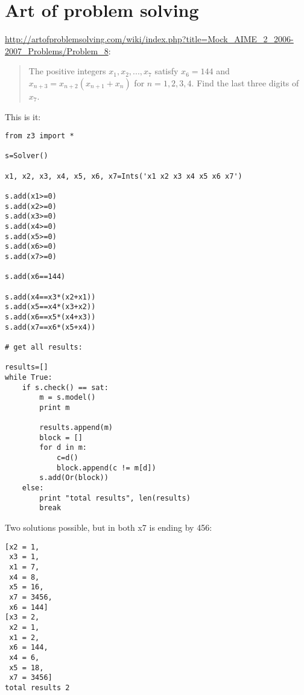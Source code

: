 \section{Art of problem solving}

\url{http://artofproblemsolving.com/wiki/index.php?title=Mock_AIME_2_2006-2007_Problems/Problem_8}:

\begin{framed}
\begin{quotation}
The positive integers $x_1, x_2, ... , x_7$ satisfy $x_6 = 144$ and $x_{n+3} = x_{n+2}(x_{n+1}+x_n)$ for $n = 1, 2, 3, 4$. Find the last three digits of $x_7$.
\end{quotation}
\end{framed}

This is it:

\begin{lstlisting}[style=custompy]
from z3 import *

s=Solver()

x1, x2, x3, x4, x5, x6, x7=Ints('x1 x2 x3 x4 x5 x6 x7')

s.add(x1>=0)
s.add(x2>=0)
s.add(x3>=0)
s.add(x4>=0)
s.add(x5>=0)
s.add(x6>=0)
s.add(x7>=0)

s.add(x6==144)

s.add(x4==x3*(x2+x1))
s.add(x5==x4*(x3+x2))
s.add(x6==x5*(x4+x3))
s.add(x7==x6*(x5+x4))

# get all results:

results=[]
while True:
    if s.check() == sat:
        m = s.model()
        print m

        results.append(m)
        block = []
        for d in m:
            c=d()
            block.append(c != m[d])
        s.add(Or(block))
    else:
        print "total results", len(results)
        break
\end{lstlisting}

Two solutions possible, but in both x7 is ending by 456:

\begin{lstlisting}
[x2 = 1,
 x3 = 1,
 x1 = 7,
 x4 = 8,
 x5 = 16,
 x7 = 3456,
 x6 = 144]
[x3 = 2,
 x2 = 1,
 x1 = 2,
 x6 = 144,
 x4 = 6,
 x5 = 18,
 x7 = 3456]
total results 2
\end{lstlisting}

